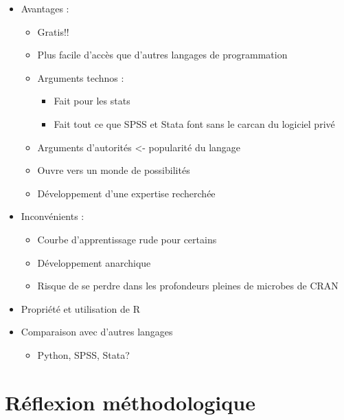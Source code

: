 \documentclass[
  letterpaper,
]{scrbook}
\providecommand{\tightlist}{%
  \setlength{\itemsep}{0pt}\setlength{\parskip}{0pt}}\usepackage{longtable,booktabs,array}
\begin{document}
\begin{itemize}
\tightlist
\item
  Avantages :

  \begin{itemize}
  \tightlist
  \item
    Gratis!!
  \item
    Plus facile d'accès que d'autres langages de programmation
  \item
    Arguments technos :

    \begin{itemize}
    \tightlist
    \item
      Fait pour les stats
    \item
      Fait tout ce que SPSS et Stata font sans le carcan du logiciel
      privé
    \end{itemize}
  \item
    Arguments d'autorités \textless- popularité du langage
  \item
    Ouvre vers un monde de possibilités
  \item
    Développement d'une expertise recherchée
  \end{itemize}
\item
  Inconvénients :

  \begin{itemize}
  \tightlist
  \item
    Courbe d'apprentissage rude pour certains
  \item
    Développement anarchique
  \item
    Risque de se perdre dans les profondeurs pleines de microbes de CRAN
  \end{itemize}
\item
  Propriété et utilisation de R
\item
  Comparaison avec d'autres langages

  \begin{itemize}
  \tightlist
  \item
    Python, SPSS, Stata?
  \end{itemize}
\end{itemize}

\hypertarget{ruxe9flexion-muxe9thodologique}{%
\section{Réflexion
méthodologique}\label{ruxe9flexion-muxe9thodologique}}
\end{document}
